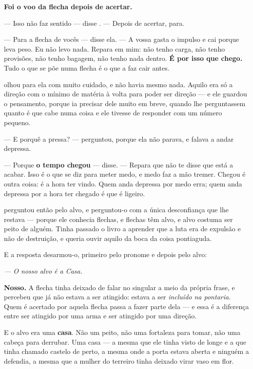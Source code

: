 \documentclass[livro.tex]{subfiles}
\begin{document}
\medskip
\noindent \textbf{Foi o voo da flecha depois de acertar.}

\medskip
\noindent --- Isso não faz sentido --- disse \Ben . --- Depois de acertar,
para.

--- Para a flecha de vocês --- disse ela. --- A vossa gasta o impulso e cai
porque leva peso. Eu não levo nada. Repara em mim: não tenho carga, não tenho
provisões, não tenho bagagem, não tenho nada dentro. \textbf{É por isso que
chego.} Tudo o que se põe numa flecha é o que a faz cair antes.

\medskip
\noindent \Ben olhou para ela com muito cuidado, e não havia mesmo nada.
Aquilo era só a direção com o mínimo de matéria à volta para poder ser
direção --- e ele guardou o pensamento, porque ia precisar dele muito em breve,
quando lhe perguntassem quanto é que cabe numa coisa e ele tivesse de responder
com um número pequeno.

\medskip
\noindent --- E porquê a pressa? --- perguntou, porque ela não parava, e falava
a andar depressa.

--- Porque \textbf{o tempo chegou} --- disse. --- Repara que não te disse que
está a acabar. Isso é o que se diz para meter medo, e medo faz a mão tremer.
Chegou é outra coisa: é a hora ter vindo. Quem anda depressa por medo erra; quem
anda depressa por a hora ter chegado é que é ligeiro.

\medskip
\noindent \Ben perguntou então pelo alvo, e perguntou-o com a única
desconfiança que lhe restava --- porque ele conhecia flechas, e flechas têm alvo,
e alvo costuma ser peito de alguém. Tinha passado o livro a aprender que a luta
era de expulsão e não de destruição, e queria ouvir aquilo da boca da coisa
pontiaguda.

\medskip
\noindent E a resposta desarmou-o, primeiro pelo pronome e depois pelo alvo:

\begin{center}
\emph{--- O nosso alvo é a Casa.}
\end{center}

\medskip
\noindent \textbf{Nosso.} A flecha tinha deixado de falar no singular a meio da
própria frase, e \Ben percebeu que já não estava a ser atingido: estava a ser
\emph{incluído na pontaria}. Quem é acertado por aquela flecha passa a fazer
parte dela --- e essa é a diferença entre ser atingido por uma arma e ser
atingido por uma direção.

\medskip
\noindent E o alvo era uma \textbf{casa}. Não um peito, não uma fortaleza para
tomar, não uma cabeça para derrubar. Uma casa --- a mesma que ele tinha visto
de longe e a que tinha chamado castelo de perto, a mesma onde a porta estava
aberta e ninguém a defendia, a mesma que a mulher do terreiro tinha deixado
virar vaso em flor.
\end{document}
